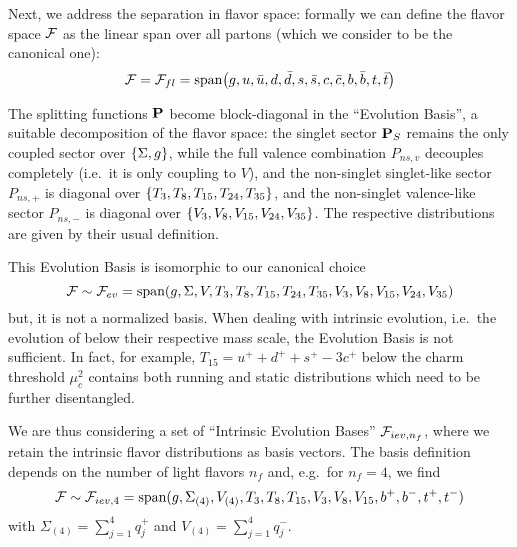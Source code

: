Next, we address the separation in flavor space: formally we can define the
flavor space $\mathcal{F}$ as the linear span over all partons (which we consider to be
the canonical one):
\begin{equation}
    \mathcal{F} = \mathcal{F}_{fl} = \text{span}\qty(g, u, \bar u, d, \bar d, s, \bar s, c, \bar c, b, \bar b, t, \bar t)
\end{equation}

The splitting functions $\vb P$ become block-diagonal in the \enquote{Evolution
Basis}, a suitable decomposition of the flavor space: the singlet sector $\vb
P_S$ remains the only coupled sector over $\qty{\Sigma, g}$, while the full
valence combination $P_{ns,v}$ decouples completely (i.e.\ it is only coupling
to $V$), and the non-singlet singlet-like sector $P_{ns,+}$ is diagonal over
$\qty{T_3,T_8,T_{15},T_{24},T_{35}}$, and the non-singlet valence-like sector
$P_{ns,-}$ is diagonal over $\qty{V_3,V_8,V_{15},V_{24},V_{35}}$.
The respective distributions are given by their usual definition.

This Evolution Basis is isomorphic to our canonical choice
\begin{equation}
    \mathcal{F} \sim \mathcal{F}_{ev} = \text{span}(g, \Sigma, V, T_{3}, T_{8}, T_{15}, T_{24}, T_{35}, V_{3}, V_{8}, V_{15}, V_{24}, V_{35})
\end{equation}
but, it is not a normalized basis. When dealing with intrinsic evolution, i.e.\
the evolution of \pdfs below their respective mass scale, the Evolution Basis
is not sufficient. In fact, for example, $T_{15} = u^{+} + d^{+} +
s^{+} - 3c^{+}$ below the charm threshold $\mu_c^2$ contains both running and static
distributions which need to be further disentangled.

We are thus considering a set of \enquote{Intrinsic Evolution Bases} $\mathcal{F}_{iev,
n_f}$, where we retain the intrinsic flavor distributions as basis vectors.
The basis definition depends on the number of light flavors $n_f$ and, e.g.\
for $n_f=4$, we find
\begin{equation}
    \mathcal{F} \sim \mathcal{F}_{iev,4} = \text{span}(g, \Sigma_{(4)}, V_{(4)}, T_{3}, T_{8}, T_{15}, V_{3}, V_{8}, V_{15}, b^+, b^-, t^+, t^-)
\end{equation}
with $\Sigma_{(4)} = \sum\limits_{j=1}^4 q_j^+$ and $V_{(4)} =
\sum\limits_{j=1}^4 q_j^-$.
